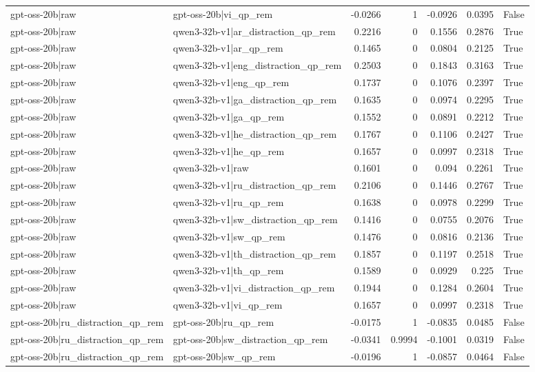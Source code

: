 \begin{table}
\begin{tabular}{l l r r r r l}
gpt-oss-20b|raw & gpt-oss-20b|vi_qp_rem & -0.0266 & 1 & -0.0926 & 0.0395 & False \\
gpt-oss-20b|raw & qwen3-32b-v1|ar_distraction_qp_rem & 0.2216 & 0 & 0.1556 & 0.2876 & True \\
gpt-oss-20b|raw & qwen3-32b-v1|ar_qp_rem & 0.1465 & 0 & 0.0804 & 0.2125 & True \\
gpt-oss-20b|raw & qwen3-32b-v1|eng_distraction_qp_rem & 0.2503 & 0 & 0.1843 & 0.3163 & True \\
gpt-oss-20b|raw & qwen3-32b-v1|eng_qp_rem & 0.1737 & 0 & 0.1076 & 0.2397 & True \\
gpt-oss-20b|raw & qwen3-32b-v1|ga_distraction_qp_rem & 0.1635 & 0 & 0.0974 & 0.2295 & True \\
gpt-oss-20b|raw & qwen3-32b-v1|ga_qp_rem & 0.1552 & 0 & 0.0891 & 0.2212 & True \\
gpt-oss-20b|raw & qwen3-32b-v1|he_distraction_qp_rem & 0.1767 & 0 & 0.1106 & 0.2427 & True \\
gpt-oss-20b|raw & qwen3-32b-v1|he_qp_rem & 0.1657 & 0 & 0.0997 & 0.2318 & True \\
gpt-oss-20b|raw & qwen3-32b-v1|raw & 0.1601 & 0 & 0.094 & 0.2261 & True \\
gpt-oss-20b|raw & qwen3-32b-v1|ru_distraction_qp_rem & 0.2106 & 0 & 0.1446 & 0.2767 & True \\
gpt-oss-20b|raw & qwen3-32b-v1|ru_qp_rem & 0.1638 & 0 & 0.0978 & 0.2299 & True \\
gpt-oss-20b|raw & qwen3-32b-v1|sw_distraction_qp_rem & 0.1416 & 0 & 0.0755 & 0.2076 & True \\
gpt-oss-20b|raw & qwen3-32b-v1|sw_qp_rem & 0.1476 & 0 & 0.0816 & 0.2136 & True \\
gpt-oss-20b|raw & qwen3-32b-v1|th_distraction_qp_rem & 0.1857 & 0 & 0.1197 & 0.2518 & True \\
gpt-oss-20b|raw & qwen3-32b-v1|th_qp_rem & 0.1589 & 0 & 0.0929 & 0.225 & True \\
gpt-oss-20b|raw & qwen3-32b-v1|vi_distraction_qp_rem & 0.1944 & 0 & 0.1284 & 0.2604 & True \\
gpt-oss-20b|raw & qwen3-32b-v1|vi_qp_rem & 0.1657 & 0 & 0.0997 & 0.2318 & True \\
gpt-oss-20b|ru_distraction_qp_rem & gpt-oss-20b|ru_qp_rem & -0.0175 & 1 & -0.0835 & 0.0485 & False \\
gpt-oss-20b|ru_distraction_qp_rem & gpt-oss-20b|sw_distraction_qp_rem & -0.0341 & 0.9994 & -0.1001 & 0.0319 & False \\
gpt-oss-20b|ru_distraction_qp_rem & gpt-oss-20b|sw_qp_rem & -0.0196 & 1 & -0.0857 & 0.0464 & False \\

\end{tabular}
\end{table}

